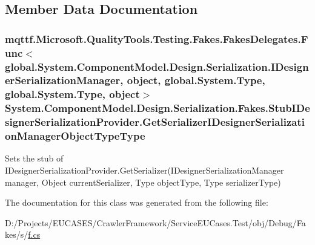 \subsection{Member Data Documentation}
\hypertarget{class_system_1_1_component_model_1_1_design_1_1_serialization_1_1_fakes_1_1_stub_i_designer_serialization_provider_a4f5258ddad167e4becb001acbdac35f3}{
\subsubsection[{Get\-Serializer\-I\-Designer\-Serialization\-Manager\-Object\-Type\-Type}]{\setlength{\rightskip}{0pt plus 5cm}mqttf.\-Microsoft.\-Quality\-Tools.\-Testing.\-Fakes.\-Fakes\-Delegates.\-Func$<$global.\-System.\-Component\-Model.\-Design.\-Serialization.\-I\-Designer\-Serialization\-Manager, object, global.\-System.\-Type, global.\-System.\-Type, object$>$ System.\-Component\-Model.\-Design.\-Serialization.\-Fakes.\-Stub\-I\-Designer\-Serialization\-Provider.\-Get\-Serializer\-I\-Designer\-Serialization\-Manager\-Object\-Type\-Type}}\label{class_system_1_1_component_model_1_1_design_1_1_serialization_1_1_fakes_1_1_stub_i_designer_serialization_provider_a4f5258ddad167e4becb001acbdac35f3}


Sets the stub of I\-Designer\-Serialization\-Provider.\-Get\-Serializer(\-I\-Designer\-Serialization\-Manager manager, Object current\-Serializer, Type object\-Type, Type serializer\-Type)



The documentation for this class was generated from the following file\-:\begin{DoxyCompactItemize}
\item 
D\-:/\-Projects/\-E\-U\-C\-A\-S\-E\-S/\-Crawler\-Framework/\-Service\-E\-U\-Cases.\-Test/obj/\-Debug/\-Fakes/s/\hyperlink{s_2f_8cs}{f.\-cs}\end{DoxyCompactItemize}

